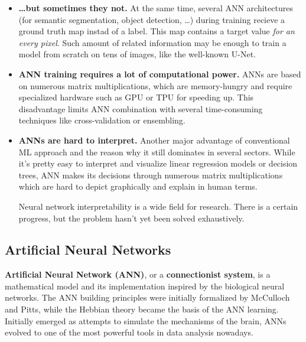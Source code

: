 \documentclass[thesis=B,english]{FITthesis}[2019/12/23]
\begin{document}
\begin{itemize}
		\item \textbf{\dots but sometimes they not.} At the same time, several ANN architectures (for semantic segmentation, object detection, \dots) during training recieve a ground truth map instad of a label. This map contains a target value \textit{for an every pixel}. Such amount of related information may be enough to train a model from scratch on tens of images, like the well-known U-Net\cite{unet}.
		
		\item \textbf{ANN training requires a lot of computational power.} ANNs are based on numerous matrix multiplications, which are memory-hungry and require specialized hardware such as GPU or TPU for speeding up. This disadvantage limits ANN combination with several time-consuming techniques like cross-validation or ensembling.
		
		\item \textbf{ANNs are hard to interpret.} Another major advantage of conventional ML approach and the reason why it still dominates in several sectors. While it's pretty easy to interpret and visualize linear regression models or decision trees, ANN makes its decisions through numerous matrix multiplications which are hard to depict graphically and explain in human terms.
		
		Neural network interpretability is a wide field for research. There is a certain progress\cite{simonyan2013deep}\cite{fan2020interpretability}, but the problem hasn't yet been solved exhaustively.
	\end{itemize} 
	
	\subsection{Artificial Neural Networks}
	
	\textbf{Artificial Neural Network (ANN)}, or a \textbf{connectionist system}, is a mathematical model and its implementation inspired by the biological neural networks. The ANN building principles were initially formalized by McCulloch and Pitts\cite{McCulloch43}, while the Hebbian theory\cite{hebb-organization-of-behavior-1949} became the basis of the ANN learning. Initially emerged as attempts to simulate the mechanisms of the brain, ANNs evolved to one of the most powerful tools in data analysis nowadays.
	
\end{document}
